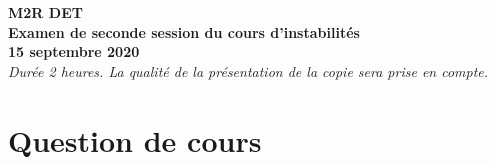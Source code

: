 \documentclass[a4paper,11pt]{article}
\begin{document}
{\Large
\noindent

\begin{center}

{\bf M2R DET \\
 Examen de seconde session du cours d'instabilités \\ 
 15 septembre  2020
 } \\
{\it \small Durée 2 heures. La qualité de la présentation de la copie sera prise en compte. 
} \\
\end{center}
}

%

\section{Question de cours}
\end{document}
